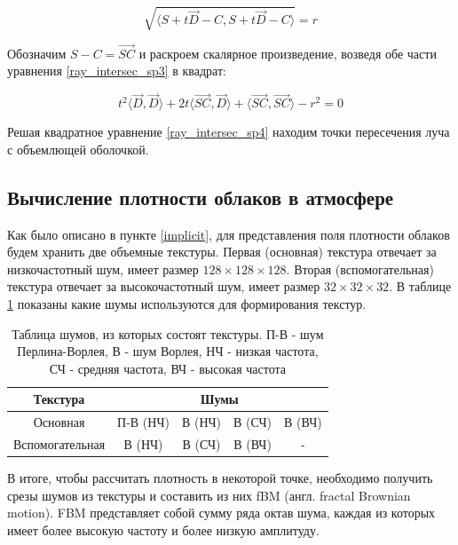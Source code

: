 \begin{equation}
	\label{ray_intersec_sp3}
	\sqrt{\langle S + t \vec{D} - C , S + t \vec{D} - C \rangle} = r
\end{equation}

Обозначим $ S - C = \vec{SC} $ и раскроем скалярное произведение, возведя обе части уравнения \eqref{ray_intersec_sp3} в квадрат:

\begin{equation}
	\label{ray_intersec_sp4}
	t ^ 2 \langle \vec{D}, \vec{D} \rangle + 2t \langle \vec{SC}, \vec{D} \rangle + \langle \vec{SC}, \vec{SC} \rangle - r ^ 2 = 0
\end{equation}

Решая квадратное уравнение \eqref{ray_intersec_sp4} находим точки пересечения луча с объемлющей оболочкой.

\subsection{Вычисление плотности облаков в атмосфере}

Как было описано в пункте \ref{implicit}, для представления поля плотности облаков будем хранить две объемные текстуры.
Первая (основная) текстура отвечает за низкочастотный шум, имеет размер $ 128 \times 128 \times 128 $. Вторая (вспомогательная) текстура отвечает за высокочастотный шум, имеет размер $ 32 \times 32 \times 32 $. 
В таблице \ref{tab:textures} показаны какие шумы используются для формирования текстур.

\begin{table}[b]
	\begin{center}
\begin{tabular}{|c|c|c|c|c|}
	\hline
	Текстура & \multicolumn{4}{c|}{Шумы} \\
	\hline
	Основная & П-В (НЧ) & В (НЧ) & В (СЧ) & В (ВЧ)\\
	\hline
	Вспомогательная & В (НЧ) & В (СЧ) & В (ВЧ) & -\\
	\hline
\end{tabular}
\end{center}
\caption{Таблица шумов, из которых состоят текстуры. П-В - шум Перлина-Ворлея, В - шум Ворлея, НЧ - низкая частота, СЧ - средняя частота, ВЧ - высокая частота}
\label{tab:textures}
\end{table}

В итоге, чтобы рассчитать плотность в некоторой точке, необходимо получить срезы шумов из текстуры и составить из них fBM (англ. fractal Brownian motion). FBM представляет собой сумму ряда октав шума, каждая из которых имеет более высокую частоту и более низкую амплитуду.

